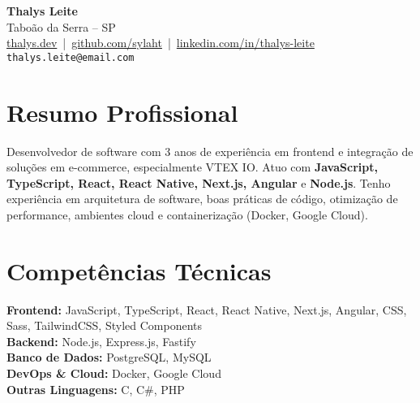 \documentclass[a4paper,10pt]{article}
\begin{document}
\begin{center}
    {\LARGE \textbf{Thalys Leite}}\\[4pt]
    Taboão da Serra – SP \\[2pt]
    \href{https://thalys.dev}{thalys.dev} \,|\, 
    \href{https://github.com/sylaht}{github.com/sylaht} \,|\, 
    \href{https://www.linkedin.com/in/thalys-leite-94a80a234/}{linkedin.com/in/thalys-leite}\\[6pt]
    \texttt{thalys.leite@email.com} %
\end{center}

\vspace{0.4cm}

\section*{Resumo Profissional}
Desenvolvedor de software com 3 anos de experiência em frontend e integração de soluções em e-commerce, especialmente VTEX IO. 
Atuo com \textbf{JavaScript, TypeScript, React, React Native, Next.js, Angular} e \textbf{Node.js}. 
Tenho experiência em arquitetura de software, boas práticas de código, otimização de performance, ambientes cloud e containerização (Docker, Google Cloud).

\section*{Competências Técnicas}
\textbf{Frontend:} JavaScript, TypeScript, React, React Native, Next.js, Angular, CSS, Sass, TailwindCSS, Styled Components\\
\textbf{Backend:} Node.js, Express.js, Fastify\\
\textbf{Banco de Dados:} PostgreSQL, MySQL\\
\textbf{DevOps \& Cloud:} Docker, Google Cloud\\
\textbf{Outras Linguagens:} C, C\#, PHP

\end{document}
